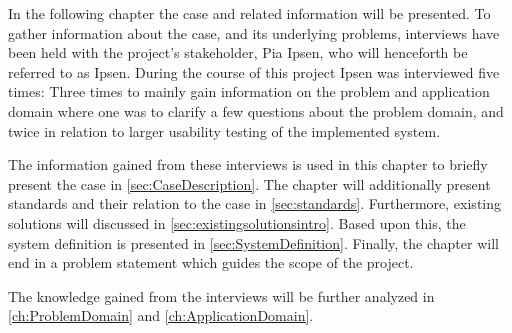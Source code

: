 In the following chapter the case and related information will be presented.
To gather information about the case, and its underlying problems, interviews have been held with the project's stakeholder, Pia Ipsen, who will henceforth be referred to as Ipsen.
During the course of this project Ipsen was interviewed five times:
Three times to mainly gain information on the problem and application domain where one was to clarify a few questions about the problem domain, and twice in relation to larger usability testing of the implemented system.

The information gained from these interviews is used in this chapter to briefly present the case in \cref{sec:CaseDescription}.
The chapter will additionally present standards and their relation to the case in \cref{sec:standards}.
Furthermore, existing solutions will discussed in \cref{sec:existingsolutionsintro}.
Based upon this, the system definition is presented in \cref{sec:SystemDefinition}.
Finally, the chapter will end in a problem statement which guides the scope of the project.

The knowledge gained from the interviews will be further analyzed in \cref{ch:ProblemDomain} and \cref{ch:ApplicationDomain}.
